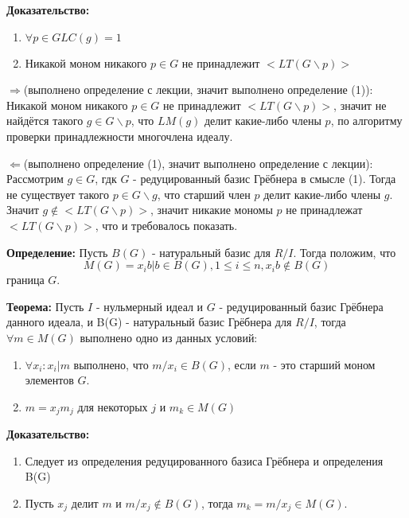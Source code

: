 \documentclass{article}
\begin{document}
    \textbf{Доказательство:} 
        \begin{enumerate}
            \item $\forall p \in G LC(g) = 1$ 
            \item Никакой моном никакого $p \in G$ не принадлежит $<LT(G\backslash{p})>$ 
        \end{enumerate}

    $\Rightarrow$(выполнено определение с лекции, значит выполнено определение (1)):
        Никакой моном никакого $p \in G$ не принадлежит $<LT(G\backslash{p})>$, значит не найдётся такого $g \in G\backslash{p}$, что 
        $LM(g)$ делит какие-либо члены $p$, по алгоритму проверки принадлежности многочлена идеалу.

    $\Leftarrow$(выполнено определение (1), значит выполнено определение с лекции):
        Рассмотрим $g \in G$, гдк $G$ - редуцированный базис Грёбнера в смысле (1). Тогда не существует такого $p \in G\backslash{g}$,
        что старший член $p$ делит какие-либо члены $g$. Значит $g \notin <LT(G\backslash{p})>$, значит никакие мономы $p$ 
        не принадлежат $<LT(G\backslash{p})>$, что и требовалось показать.

    
    \textbf{Определение:} Пусть $B(G)$ - натуральный базис для $R/I$. Тогда положим, что
    $$M(G) = {x_ib | b \in B(G), 1\leq i \leq n, x_ib \notin B(G)}$$ граница $G$.

    \newpage

    \textbf{Теорема:} Пусть $I$ - нульмерный идеал и $G$ - редуцированный базис Грёбнера данного идеала, и
    B(G) - натуральный базис Грёбнера для $R/I$, тогда $\forall m \in M(G)$ выполнено одно из данных условий:

    \begin{enumerate}
        \item $\forall x_i : x_i | m$ выполнено, что $m/x_i \in B(G)$, если $m$ - это старший моном элементов $G$.
        \item $m = x_jm_j$ для некоторых $j$ и $m_k \in M(G)$
    \end{enumerate}

    \textbf{Доказательство:}
    \begin{enumerate}
        \item Следует из определения редуцированного базиса Грёбнера и определения B(G)
        \item Пусть $x_j$ делит $m$ и $m/x_j \notin B(G)$, тогда $m_k = m/x_j \in M(G)$. 
    \end{enumerate}
\end{document}
